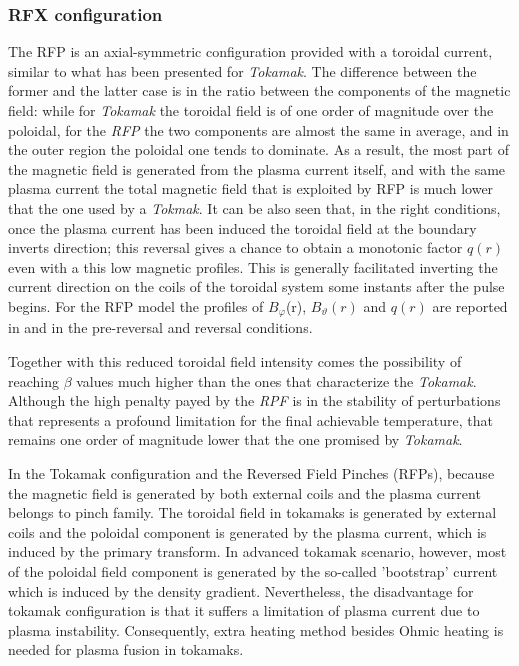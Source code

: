 \subsubsection{RFX configuration}
The \ac{RFP} is an axial-symmetric configuration provided with a toroidal current, similar to what has been presented for \textit{Tokamak}. The difference between the former and the latter case is in the ratio between the components of the magnetic field: while for \textit{Tokamak} the toroidal field is of one order of magnitude over the poloidal, for the \textit{RFP} the two components are almost the same in average, and in the outer region the poloidal one tends to dominate. As a result, the most part of the magnetic field is generated from the plasma current itself, and with the same plasma current the total magnetic field that is exploited by \acs{RFP} is much lower that the one used by a \textit{Tokmak}. It can be also seen that, in the right conditions, once the plasma current has been induced the toroidal field at the boundary inverts direction; this reversal gives a chance to obtain a monotonic factor $q(r)$ even with a this low magnetic profiles. This is generally facilitated inverting the current direction on the coils of the toroidal system some instants after the pulse begins. For the \acs{RFP} model the profiles of $B_\varphi$(r), $B_\vartheta(r)$ and $q(r)$ are reported in \Figure{\ref{fig:intro_safety_factor_profiles_b}} and \Figure{\ref{fig:intro_safety_factor_profiles_c}} in the pre-reversal and reversal conditions.

Together with this reduced toroidal field intensity comes the possibility of reaching $\beta$ values much higher than the ones that characterize the \textit{Tokamak}. Although the high penalty payed by the \textit{RPF} is in the stability of perturbations that represents a profound limitation for the final achievable temperature, that remains one order of magnitude lower that the one promised by \textit{Tokamak}.
 

% 
In the Tokamak configuration and the Reversed Field Pinches (RFPs), because the magnetic field is generated by both external coils and the plasma current  belongs to pinch family. 
%
The toroidal field in tokamaks is generated by external coils and the poloidal component is generated by the plasma current, which is induced by the primary transform. In advanced tokamak scenario, however, most of the poloidal field component is generated by the so-called ’bootstrap’ current which is induced by the density gradient. Nevertheless, the disadvantage for tokamak configuration is that it suffers a limitation of plasma current due to plasma instability. Consequently, extra heating method besides Ohmic heating is needed for plasma fusion in tokamaks. 
%
%

